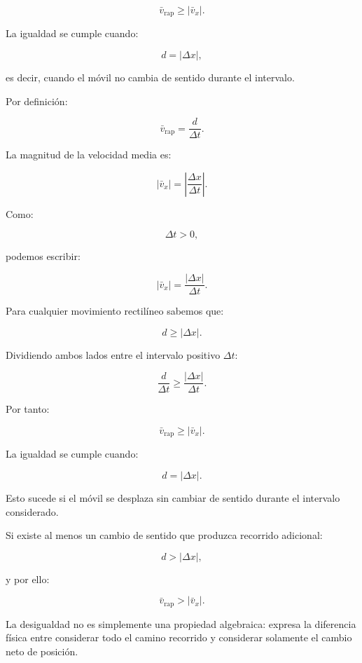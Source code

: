 \begin{respuesta}
\[ \boxed{\bar{v}_{\mathrm{rap}}\geq|\bar{v}_x|}. \]

La igualdad se cumple cuando:

\[ d=|\Delta x|, \]

es decir, cuando el móvil no cambia de sentido durante el intervalo.
\end{respuesta}

\begin{explicacion}
Por definición:

\[ \bar{v}_{\mathrm{rap}}=\frac{d}{\Delta t}. \]

La magnitud de la velocidad media es:

\[
|\bar{v}_x|
=
\left|
\frac{\Delta x}{\Delta t}
\right|.
\]

Como:

\[ \Delta t>0, \]

podemos escribir:

\[
|\bar{v}_x|
=
\frac{|\Delta x|}{\Delta t}.
\]

Para cualquier movimiento rectilíneo sabemos que:

\[ d\geq|\Delta x|. \]

Dividiendo ambos lados entre el intervalo positivo \(\Delta t\):

\[
\frac{d}{\Delta t}
\geq
\frac{|\Delta x|}{\Delta t}.
\]

Por tanto:

\[ \boxed{\bar{v}_{\mathrm{rap}}\geq|\bar{v}_x|}. \]

La igualdad se cumple cuando:

\[ d=|\Delta x|. \]

Esto sucede si el móvil se desplaza sin cambiar de sentido durante el intervalo considerado.

Si existe al menos un cambio de sentido que produzca recorrido adicional:

\[ d>|\Delta x|, \]

y por ello:

\[ \bar{v}_{\mathrm{rap}}>|\bar{v}_x|. \]

La desigualdad no es simplemente una propiedad algebraica: expresa la diferencia física entre considerar todo el camino recorrido y considerar solamente el cambio neto de posición.
\end{explicacion}